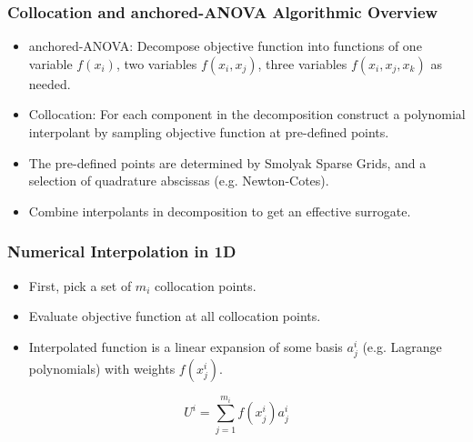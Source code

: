 \documentclass{beamer}
\begin{document}
\begin{frame}
\frametitle{Collocation and anchored-ANOVA Algorithmic Overview}

\begin{itemize}
  \item anchored-ANOVA: Decompose objective function into functions of one variable $f(x_i)$, two variables $f(x_i, x_j)$, three variables $f(x_i, x_j, x_k)$ as needed.
  \item Collocation: For each component in the decomposition construct a polynomial interpolant by sampling objective function at pre-defined points.
  \item The pre-defined points are determined by Smolyak Sparse Grids, and a selection of quadrature abscissas (e.g. Newton-Cotes). 
  \item Combine interpolants in decomposition to get an effective surrogate. 
\end{itemize}

\end{frame}
\begin{frame}
\frametitle{Numerical Interpolation in 1D}

\begin{itemize}
  \item First, pick a set of $m_i$ collocation points.   
  \item Evaluate objective function at all collocation points.
  \item Interpolated function is a linear expansion of some basis $a_j^i$ (e.g. Lagrange polynomials) with weights $f\left(x_j^i\right)$.  
\end{itemize}

\begin{equation} 
    U^i = \sum_{j=1}^{m_i} 
     f\left(x_j^i\right) a_j^i \nonumber
\end{equation}

\end{frame}
\end{document}
